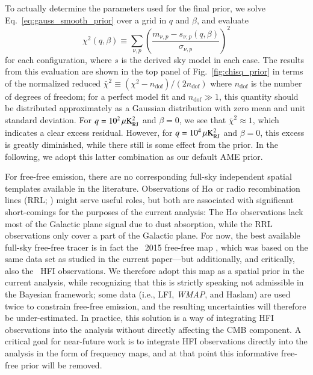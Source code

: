 \documentclass[twocolumn]{aa}
\def\WMAP{\emph{WMAP}}
\begin{document}
To actually determine the parameters used for the final prior, we
solve Eq.~\eqref{eq:gauss_smooth_prior} over a grid in $q$ and
$\beta$, and evaluate
\begin{equation}
  \chi^2(q,\beta) \equiv \sum_{\nu,p}
  \left(\frac{m_{\nu,p}-s_{\nu,p}(q,\beta)}{\sigma_{\nu,p}}\right)^2
\end{equation}
for each configuration, where $s$ is the derived sky model in each
case. The results from this evaluation are shown in the top panel of
Fig.~\ref{fig:chisq_prior} in terms of the normalized reduced
$\bar{\chi}^2 \equiv (\chi^2-n_{\mathrm{dof}})/(2n_{\mathrm{dof}})$
where $n_{\mathrm{dof}}$ is the number of degrees of freedom; for a
perfect model fit and $n_{\mathrm{dof}}\gg 1$, this quantity should be
distributed approximately as a Gaussian distribution with zero mean
and unit standard deviation. For $q=10^2\muK_{\mathrm{RJ}}^2$ and $\beta=0$, we see that
$\bar{\chi}^2\approx 1$, which indicates a clear excess
residual. However, for $q=10^4\muK_{\mathrm{RJ}}^2$ and $\beta=0$, this excess is greatly
diminished, while there still is some effect from the prior. In the
following, we adopt this latter combination as our default AME prior. 

For free-free emission, there are no corresponding full-sky
independent spatial templates available in the
literature. Observations of H$\alpha$ \citep{finkbeiner:2003} or radio
recombination lines (RRL; \citealp{alves:2015}) might serve useful
roles, but both are associated with significant short-comings for the
purposes of the current analysis: The H$\alpha$ observations lack most
of the Galactic plane signal due to dust absorption, while the RRL
observations only cover a part of the Galactic plane. For now, the
best available full-sky free-free tracer is in fact the \Planck\ 2015
free-free map \citep{planck2014-a12}, which was based on the same data
set as studied in the current paper---but additionally, and
critically, also the \Planck\ HFI observations. We therefore adopt
this map as a spatial prior in the current analysis, while recognizing
that this is strictly speaking not admissible in the Bayesian
framework; some data (i.e., LFI, \WMAP, and Haslam) are used twice to
constrain free-free emission, and the resulting uncertainties will
therefore be under-estimated. In practice, this solution is a way of
integrating HFI observations into the analysis without directly
affecting the CMB component. A critical goal for near-future work is
to integrate HFI observations directly into the analysis in the form
of frequency maps, and at that point this informative free-free prior will
be removed.
\end{document}
